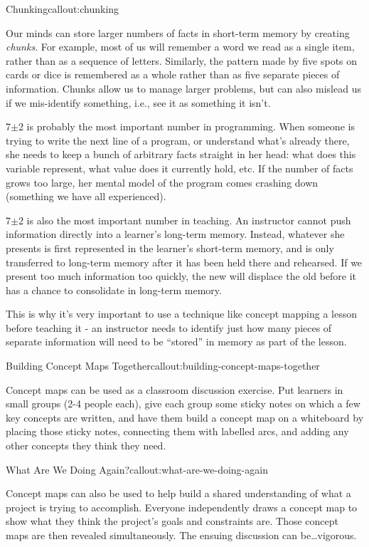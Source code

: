 \begin{callout}{Chunking}{callout:chunking}

Our minds can store larger numbers of facts in short-term memory by
creating \emph{chunks}. For example, most of us will remember a word
we read as a single item, rather than as a sequence of letters.
Similarly, the pattern made by five spots on cards or dice is
remembered as a whole rather than as five separate pieces of
information.  Chunks allow us to manage larger problems, but can also
mislead us if we mis-identify something, i.e., see it as something it
isn't.

\end{callout}

7$\pm$2 is probably the most important number in programming. When
someone is trying to write the next line of a program, or understand
what's already there, she needs to keep a bunch of arbitrary facts
straight in her head: what does this variable represent, what value
does it currently hold, etc. If the number of facts grows too large,
her mental model of the program comes crashing down (something we have
all experienced).

7$\pm$2 is also the most important number in teaching. An instructor
cannot push information directly into a learner's long-term
memory. Instead, whatever she presents is first represented in the
learner's short-term memory, and is only transferred to long-term
memory after it has been held there and rehearsed. If we present too
much information too quickly, the new will displace the old before it
has a chance to consolidate in long-term memory.

This is why it's very important to use a technique like concept
mapping a lesson before teaching it - an instructor needs to identify
just how many pieces of separate information will need to be
``stored'' in memory as part of the lesson.

\begin{callout}{Building Concept Maps Together}{callout:building-concept-maps-together}

Concept maps can be used as a classroom discussion exercise. Put
learners in small groups (2-4 people each), give each group some sticky
notes on which a few key concepts are written, and have them build a
concept map on a whiteboard by placing those sticky notes, connecting
them with labelled arcs, and adding any other concepts they think they
need.
\end{callout}

\begin{callout}{What Are We Doing Again?}{callout:what-are-we-doing-again}

Concept maps can also be used to help build a shared understanding of
what a project is trying to accomplish. Everyone independently draws a
concept map to show what they think the project's goals and constraints
are. Those concept maps are then revealed simultaneously. The ensuing
discussion can be\ldots{}vigorous.

\end{callout}


